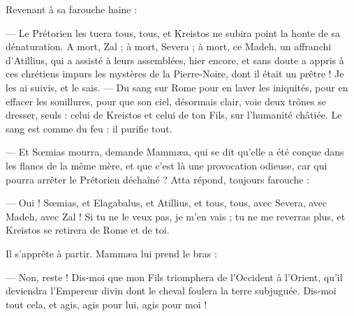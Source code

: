 \documentclass[a4paper, 11pt, oneside, polutonikogreek, french]{article}
\begin{document}
Revenant à sa farouche haine :

--- Le Prétorien les tuera tous, tous, et Kreistos ne subira point la honte de sa dénaturation. A mort, Zal ; à mort, Severa ; à mort, ce Madeh, un affranchi d'Atillius, qui a assisté à leurs assemblées, hier encore, et sans doute a appris à ces chrétiens impurs les mystères de la Pierre-Noire, dont il était un prêtre ! Je les ai suivis, et le sais. --- Du sang sur Rome pour en laver les iniquités, pour en effacer les souillures, pour que son ciel, désormais clair, voie deux trônes se dresser, seuls : celui de Kreistos et celui de ton Fils, sur l'humanité châtiée. Le sang est comme du feu : il purifie tout.

--- Et Sœmias mourra, demande Mammæa, qui se dit qu'elle a été conçue dans les flancs de la même mère, et que c'est là une provocation odieuse, car qui pourra arrêter le Prétorien déchaîné ? Atta répond, toujours farouche :

--- Oui ! Sœmias, et Elagabalus, et Atillius, et tous, tous, avec Severa, avec Madeh, avec Zal ! Si tu ne le veux pas, je m'en vais ; tu ne me reverras plus, et Kreistos se retirera de Rome et de toi.

Il s'apprête à partir. Mammæa lui prend le bras :

--- Non, reste ! Dis-moi que mon Fils triomphera de l'Occident à l'Orient, qu'il deviendra l'Empereur divin dont le cheval foulera la terre subjuguée. Dis-moi tout cela, et agis, agis pour lui, agis pour moi !
\end{document}
